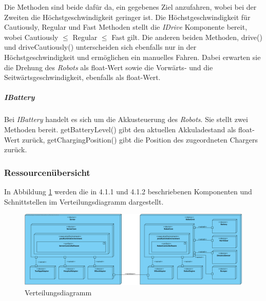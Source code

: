     		Die Methoden sind beide dafür da, ein gegebenes Ziel anzufahren, wobei bei der Zweiten die Höchstgeschwindigkeit geringer ist.
    		 Die Höchstgeschwindigkeit für Cautiously, Regular und Fast Methoden stellt die \emph{IDrive} Komponente bereit, wobei Cautiously $\leq$ Regular $\leq$ Fast gilt.
    		 Die anderen beiden Methoden, drive() und driveCautiously() unterscheiden sich ebenfalls nur in der Höchstgeschwindigkeit und ermöglichen ein manuelles Fahren.
    		 Dabei erwarten sie die Drehung des \emph{Robots} als float-Wert sowie die Vorwärts- und die Seitwärtsgeschwindigkeit, ebenfalls als float-Wert.
    	\subparagraph{IBattery}\label{ibattery}
    		Bei \emph{IBattery} handelt es sich um die Akkusteuerung des \emph{Robots}.
    		Sie stellt zwei Methoden bereit.
    		getBatteryLevel() gibt den aktuellen Akkuladestand als float-Wert zurück, getChargingPosition() gibt die Position des zugeordneten Chargers zurück.


\pagebreak
\subsubsection{Ressourcenübersicht}
    In Abbildung \ref{fig:4-1-3-verteilungsdiagramm} werden die in 4.1.1 und 4.1.2 beschriebenen
    Komponenten und Schnittstellen im Verteilungsdiagramm dargestellt.

    \begin{figure}[H]
      \centering
      \includegraphics[width=1.2\textwidth, angle=90]{img/2-Analyse-4-Produktumgebung}
      \caption{Verteilungsdiagramm}
      \label{fig:4-1-3-verteilungsdiagramm}
    \end{figure}
